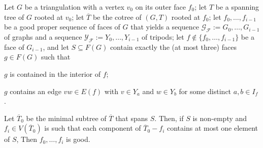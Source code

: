 \documentclass{patmorin}
\begin{document}
\begin{lem}\label{lca_sperner}
  Let $G$ be a triangulation with a vertex $v_0$ on its outer face $f_0$; let $T$ be a spanning tree of $G$ rooted at $v_0$; let $\overline{T}$ be the cotree of $(G,T)$ rooted at $f_0$; let $f_0,\ldots,f_{i-1}$ be a good proper sequence of faces of $G$ that yields a sequence $\mathcal{G_F}:=G_0,\ldots,G_{i-1}$ of graphs and a sequence $\mathcal{Y_F}:=Y_0,\ldots,Y_{i-1}$ of tripods; let $f\not\in \{f_0,\ldots,f_{i-1}\}$ be a face of $G_{i-1}$, and let $S\subseteq F(G)$ contain exactly the (at most three) faces $g\in F(G)$ such that
  \begin{compactenum}[(i)]
      \item $g$ is contained in the interior of $f$;
      \item $g$ contains an edge $vw\in E(f)$ with $v\in Y_a$ and $w\in Y_b$ for some distinct $a,b\in I_f$.
  \end{compactenum}
  Let $\overline{T}_0$ be the minimal subtree of $\overline{T}$ that spans $S$.  Then, if $S$ is non-empty and $f_i\in V(\overline{T}_0)$ is such that each component of $\overline{T}_0-f_i$ contains at most one element of $S$,
  Then $f_0,\ldots,f_i$ is good.
\end{lem}
\end{document}

